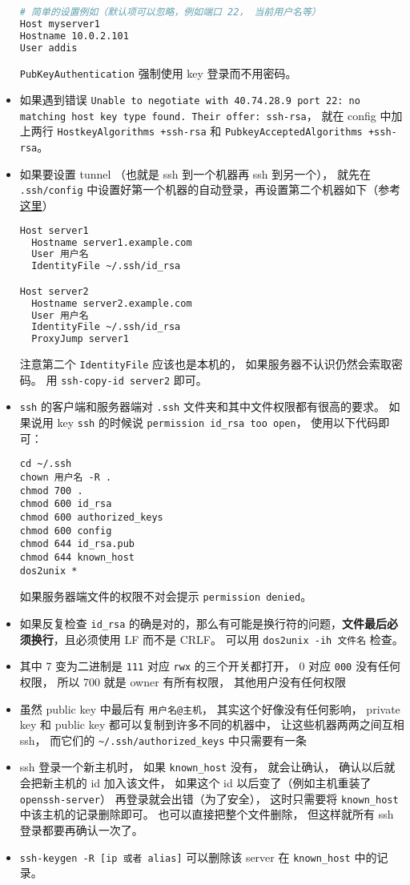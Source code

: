 \begin{itemize}
\begin{lstlisting}[language=bash]
# 简单的设置例如（默认项可以忽略，例如端口 22， 当前用户名等）
Host myserver1
Hostname 10.0.2.101
User addis
\end{lstlisting}
\verb`PubKeyAuthentication` 强制使用 key 登录而不用密码。

\item 如果遇到错误 \verb`Unable to negotiate with 40.74.28.9 port 22: no matching host key type found. Their offer: ssh-rsa`， 就在 config 中加上两行 \verb`HostkeyAlgorithms +ssh-rsa` 和 \verb`PubkeyAcceptedAlgorithms +ssh-rsa`。

\item 如果要设置 tunnel （也就是 ssh 到一个机器再 ssh 到另一个）， 就先在 \verb`.ssh/config` 中设置好第一个机器的自动登录，再设置第二个机器如下（参考\href{https://askubuntu.com/questions/311447/how-do-i-ssh-to-machine-a-via-b-in-one-command}{这里}）
\begin{lstlisting}[language=bash]
Host server1
  Hostname server1.example.com
  User 用户名
  IdentityFile ~/.ssh/id_rsa

Host server2
  Hostname server2.example.com
  User 用户名
  IdentityFile ~/.ssh/id_rsa
  ProxyJump server1
\end{lstlisting}
注意第二个 \verb`IdentityFile` 应该也是本机的， 如果服务器不认识仍然会索取密码。 用 \verb`ssh-copy-id server2` 即可。

\item \verb`ssh` 的客户端和服务器端对 \verb`.ssh` 文件夹和其中文件权限都有很高的要求。 如果说用 key \verb`ssh` 的时候说 \verb`permission id_rsa too open`， 使用以下代码即可：
\begin{lstlisting}[language=none]
cd ~/.ssh
chown 用户名 -R .
chmod 700 .
chmod 600 id_rsa
chmod 600 authorized_keys
chmod 600 config
chmod 644 id_rsa.pub
chmod 644 known_host
dos2unix *
\end{lstlisting}
如果服务器端文件的权限不对会提示 \verb`permission denied`。
\item 如果反复检查 \verb`id_rsa` 的确是对的，那么有可能是换行符的问题，\textbf{文件最后必须换行}，且必须使用 LF 而不是 CRLF。 可以用 \verb`dos2unix -ih 文件名` 检查。
\item 其中 7 变为二进制是 \verb`111` 对应 \verb`rwx` 的三个开关都打开， 0 对应 \verb`000` 没有任何权限， 所以 700 就是 owner 有所有权限， 其他用户没有任何权限
\item 虽然 public key 中最后有 \verb`用户名@主机`， 其实这个好像没有任何影响， private key 和 public key 都可以复制到许多不同的机器中， 让这些机器两两之间互相 ssh， 而它们的 \verb`~/.ssh/authorized_keys` 中只需要有一条
\item ssh 登录一个新主机时， 如果 \verb`known_host` 没有， 就会让确认， 确认以后就会把新主机的 id 加入该文件， 如果这个 id 以后变了（例如主机重装了 \verb`openssh-server`） 再登录就会出错（为了安全）， 这时只需要将 \verb`known_host` 中该主机的记录删除即可。 也可以直接把整个文件删除， 但这样就所有 ssh 登录都要再确认一次了。
\item \verb`ssh-keygen -R [ip 或者 alias]` 可以删除该 server 在 \verb`known_host` 中的记录。
\end{itemize}

